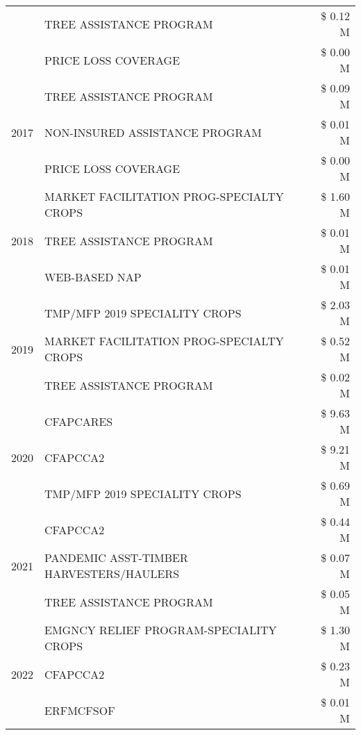 \begin{tabular}{llr}
 & TREE ASSISTANCE PROGRAM & \$ 0.12 M \\
 & PRICE LOSS COVERAGE & \$ 0.00 M \\
\cline{1-3}
\multirow[t]{3}{*}{2017} & TREE ASSISTANCE PROGRAM & \$ 0.09 M \\
 & NON-INSURED ASSISTANCE PROGRAM & \$ 0.01 M \\
 & PRICE LOSS COVERAGE & \$ 0.00 M \\
\cline{1-3}
\multirow[t]{3}{*}{2018} & MARKET FACILITATION PROG-SPECIALTY CROPS & \$ 1.60 M \\
 & TREE ASSISTANCE PROGRAM & \$ 0.01 M \\
 & WEB-BASED NAP & \$ 0.01 M \\
\cline{1-3}
\multirow[t]{3}{*}{2019} & TMP/MFP 2019 SPECIALITY CROPS & \$ 2.03 M \\
 & MARKET FACILITATION PROG-SPECIALTY CROPS & \$ 0.52 M \\
 & TREE ASSISTANCE PROGRAM & \$ 0.02 M \\
\cline{1-3}
\multirow[t]{3}{*}{2020} & CFAPCARES & \$ 9.63 M \\
 & CFAPCCA2 & \$ 9.21 M \\
 & TMP/MFP 2019 SPECIALITY CROPS & \$ 0.69 M \\
\cline{1-3}
\multirow[t]{3}{*}{2021} & CFAPCCA2 & \$ 0.44 M \\
 & PANDEMIC ASST-TIMBER HARVESTERS/HAULERS & \$ 0.07 M \\
 & TREE ASSISTANCE PROGRAM & \$ 0.05 M \\
\cline{1-3}
\multirow[t]{3}{*}{2022} & EMGNCY RELIEF PROGRAM-SPECIALITY CROPS & \$ 1.30 M \\
 & CFAPCCA2 & \$ 0.23 M \\
 & ERFMCFSOF & \$ 0.01 M \\
\cline{1-3}
\bottomrule
\end{tabular}
